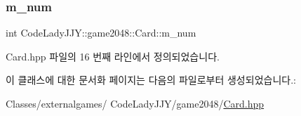 \subsubsection{\texorpdfstring{m\+\_\+num}{m\_num}}
{\footnotesize\ttfamily int Code\+Lady\+J\+J\+Y\+::game2048\+::\+Card\+::m\+\_\+num}



Card.\+hpp 파일의 16 번째 라인에서 정의되었습니다.



이 클래스에 대한 문서화 페이지는 다음의 파일로부터 생성되었습니다.\+:\begin{DoxyCompactItemize}
\item 
Classes/externalgames/ Code\+Lady\+J\+J\+Y/game2048/\hyperlink{_card_8hpp}{Card.\+hpp}\end{DoxyCompactItemize}
